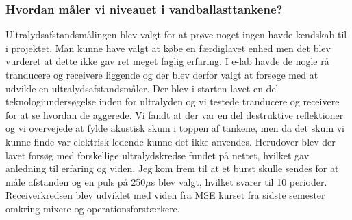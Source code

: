 \subsubsection{Hvordan måler vi niveauet i vandballasttankene?}
Ultralydsafstandsmålingen blev valgt for at prøve noget ingen havde kendskab til i projektet. Man kunne have valgt at købe en færdiglavet enhed men det blev vurderet at dette ikke gav ret meget faglig erfaring. I e-lab havde de nogle rå tranducere og receivere liggende og der blev derfor valgt at forsøge med at udvikle en ultralydsafstandsmåler. Der blev i starten lavet en del teknologiundersøgelse inden for ultralyden og vi testede tranducere og receivere for at se hvordan de aggerede. Vi fandt at der var en del destruktive reflektioner og vi overvejede at fylde akustisk skum i toppen af tankene, men da det skum vi kunne finde var elektrisk ledende kunne det ikke anvendes. Herudover blev der lavet forsøg med forskellige ultralydskredse fundet på nettet, hvilket gav anledning til erfaring og viden. Jeg kom frem til at et burst skulle sendes for at måle afstanden og en puls på 250$\mu$s blev valgt, hvilket svarer til 10 perioder. Receiverkredsen blev udviklet med viden fra MSE kurset fra sidste semester omkring mixere og operationsforstærkere.


